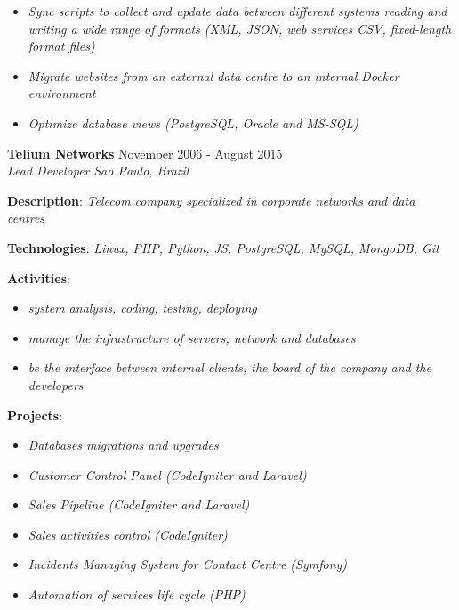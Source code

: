 \documentclass[margin]{res}
\begin{document}
\begin{resume}
\begin{description}
{\begin{itemize}
              \item{\textit{Sync scripts to collect and update data between different systems reading and writing a wide range of formats (XML, JSON, web services      CSV, fixed-length format files)}}
              \item{\textit{Migrate websites from an external data centre to an internal Docker environment}}
              \item{\textit{Optimize database views (PostgreSQL, Oracle and MS-SQL)}}
            \end{itemize}
    }
      \end{description}
    \pagebreak
    \textbf{Telium Networks} \hfill {November 2006 - August 2015}\\
  \textit{Lead Developer} \hfill \textit{Sao Paulo, Brazil}\\
  \begin{description}
    \item{\textbf{Description}: \textit{Telecom company specialized in corporate networks and data centres}}
    \item{\textbf{Technologies}: \textit{Linux, PHP, Python, JS, PostgreSQL, MySQL, MongoDB, Git}}
    \item{
      \textbf{Activities}:
      \begin{itemize}
              \item{\textit{system analysis, coding, testing, deploying}}
              \item{\textit{manage the infrastructure of servers, network and databases}}
              \item{\textit{be the interface between internal clients, the board of the company and the developers}}
            \end{itemize}
    }
        \item{
      \textbf{Projects}:
      \begin{itemize}
              \item{\textit{Databases migrations and upgrades}}
              \item{\textit{Customer Control Panel (CodeIgniter and Laravel)}}
              \item{\textit{Sales Pipeline (CodeIgniter and Laravel)}}
              \item{\textit{Sales activities control (CodeIgniter)}}
              \item{\textit{Incidents Managing System for Contact Centre (Symfony)}}
              \item{\textit{Automation of services life cycle (PHP)}}

\end{itemize}}
\end{description}
\end{resume}
\end{document}

